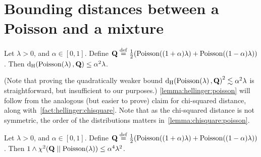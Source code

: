\documentclass[10pt]{article}
\newcommand{\bigq}{\mathbf{Q}}
\begin{document}
\section{Bounding distances between a Poisson and a mixture}
\begin{lemma}
  \label{lemma:hellinger:poisson}
Let $\lambda>0$, and $\alpha\in[0,1]$. Define $\bigq\eqdef \frac{1}{2}(\poisson{(1+\alpha)\lambda} +\poisson{ (1-\alpha)\lambda) }$. Then $\hellinger{ \poisson{\lambda} }{ \bigq } \leq \alpha^2\lambda$.
\end{lemma}
(Note that proving the quadratically weaker bound $\hellinger{ \poisson{\lambda} }{ \bigq }^2 \lesssim \alpha^2\lambda$ is straightforward, but insufficient to our purposes.) \autoref{lemma:hellinger:poisson} will follow from the analogous (but easier to prove) claim for chi-squared distance, along with~\autoref{fact:hellinger:chisquare}. Note that as the chi-squared distance is not symmetric, the order of the distributions matters in~\autoref{lemma:chisquare:poisson}.
\begin{lemma}
  \label{lemma:chisquare:poisson}
Let $\lambda>0$, and $\alpha\in[0,1]$. Define $\bigq\eqdef \frac{1}{2}(\poisson{(1+\alpha)\lambda} +\poisson{ (1-\alpha)\lambda) }$. Then $1\land \chisquare{ \bigq }{ \poisson{\lambda} } \leq \alpha^4\lambda^2$.
\end{lemma}
\end{document}
